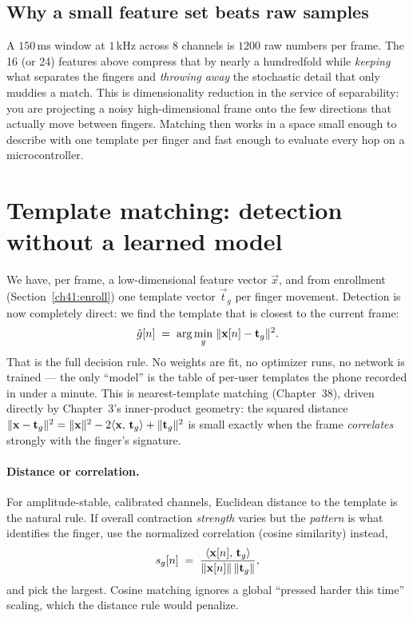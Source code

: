 \subsection{Why a small feature set beats raw samples}

\begin{happeningbox}
A $150\,$ms window at $1\,$kHz across 8 channels is $1200$ raw numbers per
frame. The 16 (or 24) features above compress that by nearly a hundredfold while
\emph{keeping} what separates the fingers and \emph{throwing away} the stochastic
detail that only muddies a match. This is dimensionality reduction in the service
of separability: you are projecting a noisy high-dimensional frame onto the few
directions that actually move between fingers. Matching then works in a space
small enough to describe with one template per finger and fast enough to evaluate
every hop on a microcontroller.
\end{happeningbox}

\section{Template matching: detection without a learned model}
\label{ch41:matching}

We have, per frame, a low-dimensional feature vector $\vec{x}$, and from
enrollment (Section~\ref{ch41:enroll}) one template vector $\vec{t}_g$ per finger
movement. Detection is now completely direct: we find the template that is closest to the current frame:
\[
  \hat{g}[n] \;=\; \arg\min_{g}\; \lVert\mathbf{x}[n] - \mathbf{t}_g\rVert^2 .
\]
That is the full decision rule. No weights are fit, no optimizer runs, no
network is trained --- the only ``model'' is the table of per-user templates the
phone recorded in under a minute. This is nearest-template matching (Chapter~38), driven directly by Chapter~3's inner-product geometry: the squared distance
$\lVert\mathbf{x}-\mathbf{t}_g\rVert^2 = \lVert\mathbf{x}\rVert^2 - 2\langle \mathbf{x},\, \mathbf{t}_g \rangle +
\lVert\mathbf{t}_g\rVert^2$ is small exactly when the frame \emph{correlates} strongly
with the finger's signature.

\paragraph{Distance or correlation.} For amplitude-stable, calibrated channels,
Euclidean distance to the template is the natural rule. If overall contraction
\emph{strength} varies but the \emph{pattern} is what identifies the finger, use
the normalized correlation (cosine similarity) instead,
\[
  s_g[n] \;=\; \frac{\langle \mathbf{x}[n],\, \mathbf{t}_g \rangle}
                    {\lVert\mathbf{x}[n]\rVert\,\lVert\mathbf{t}_g\rVert},
\]
and pick the largest. Cosine matching ignores a global ``pressed harder this
time'' scaling, which the distance rule would penalize.


